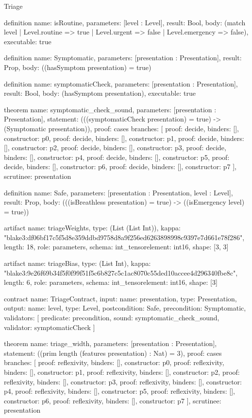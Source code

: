 \begin{lexlean}{Triage}
\begin{semanticmodule}
definition{
  name: isRoutine,
  parameters: [level : Level],
  result: Bool,
  body: (match level | Level.routine => true | Level.urgent => false | Level.emergency => false),
  executable: true
}

definition{
  name: Symptomatic,
  parameters: [presentation : Presentation],
  result: Prop,
  body: ((hasSymptom presentation) = true)
}

definition{
  name: symptomaticCheck,
  parameters: [presentation : Presentation],
  result: Bool,
  body: (hasSymptom presentation),
  executable: true
}

theorem{
  name: symptomatic_check_sound,
  parameters: [presentation : Presentation],
  statement: (((symptomaticCheck presentation) = true) -> (Symptomatic presentation)),
  proof: cases{
    branches: [
      {proof: decide{}, binders: [], constructor: p0},
      {proof: decide{}, binders: [], constructor: p1},
      {proof: decide{}, binders: [], constructor: p2},
      {proof: decide{}, binders: [], constructor: p3},
      {proof: decide{}, binders: [], constructor: p4},
      {proof: decide{}, binders: [], constructor: p5},
      {proof: decide{}, binders: [], constructor: p6},
      {proof: decide{}, binders: [], constructor: p7}
    ],
    scrutinee: presentation
  }
}

definition{
  name: Safe,
  parameters: [presentation : Presentation, level : Level],
  result: Prop,
  body: (((isBreathless presentation) = true) -> ((isEmergency level) = true))
}

artifact{
  name: triageWeights,
  type: (List (List Int)),
  kappa: "blake3:df06bf17c5f5d8e359ddbd9758d8a9f256ed6263898998c9397e7d661e78f286",
  length: 18,
  role: parameters,
  schema: int_tensor{element: int16, shape: [3, 3]}
}

artifact{
  name: triageBias,
  type: (List Int),
  kappa: "blake3:9e26f69b34f5f0f99f51f5c6b827c5c1ac8070c55ded10accee4d296340fbe8c",
  length: 6,
  role: parameters,
  schema: int_tensor{element: int16, shape: [3]}
}

contract{
  name: TriageContract,
  input: {name: presentation, type: Presentation},
  output: {name: level, type: Level},
  postcondition: Safe,
  precondition: Symptomatic,
  validators: [
    {predicate: precondition, sound: symptomatic_check_sound, validator: symptomaticCheck}
  ]
}

theorem{
  name: triage_width,
  parameters: [presentation : Presentation],
  statement: ((prim length (features presentation) : Nat) = 3),
  proof: cases{
    branches: [
      {proof: reflexivity{}, binders: [], constructor: p0},
      {proof: reflexivity{}, binders: [], constructor: p1},
      {proof: reflexivity{}, binders: [], constructor: p2},
      {proof: reflexivity{}, binders: [], constructor: p3},
      {proof: reflexivity{}, binders: [], constructor: p4},
      {proof: reflexivity{}, binders: [], constructor: p5},
      {proof: reflexivity{}, binders: [], constructor: p6},
      {proof: reflexivity{}, binders: [], constructor: p7}
    ],
    scrutinee: presentation
  }
}


\end{semanticmodule}
\end{lexlean}
